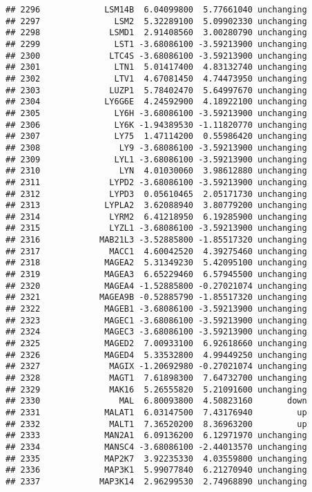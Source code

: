 \documentclass[]{article}
\begin{document}
\begin{verbatim}
## 2296             LSM14B  6.04099800  5.77661040 unchanging
## 2297               LSM2  5.32289100  5.09902330 unchanging
## 2298              LSMD1  2.91408560  3.00280790 unchanging
## 2299               LST1 -3.68086100 -3.59213900 unchanging
## 2300              LTC4S -3.68086100 -3.59213900 unchanging
## 2301               LTN1  5.01417400  4.83132740 unchanging
## 2302               LTV1  4.67081450  4.74473950 unchanging
## 2303              LUZP1  5.78402470  5.64997670 unchanging
## 2304             LY6G6E  4.24592900  4.18922100 unchanging
## 2305               LY6H -3.68086100 -3.59213900 unchanging
## 2306               LY6K -1.94389530 -1.11820770 unchanging
## 2307               LY75  1.47114200  0.55986420 unchanging
## 2308                LY9 -3.68086100 -3.59213900 unchanging
## 2309               LYL1 -3.68086100 -3.59213900 unchanging
## 2310                LYN  4.01030060  3.98612880 unchanging
## 2311              LYPD2 -3.68086100 -3.59213900 unchanging
## 2312              LYPD3  0.05610465  2.05171730 unchanging
## 2313             LYPLA2  3.62088940  3.80779200 unchanging
## 2314              LYRM2  6.41218950  6.19285900 unchanging
## 2315              LYZL1 -3.68086100 -3.59213900 unchanging
## 2316            MAB21L3 -3.52885800 -1.85517320 unchanging
## 2317              MACC1  4.60042520  4.39275460 unchanging
## 2318             MAGEA2  5.31349230  5.42095100 unchanging
## 2319             MAGEA3  6.65229460  6.57945500 unchanging
## 2320             MAGEA4 -1.52885800 -0.27021074 unchanging
## 2321            MAGEA9B -0.52885790 -1.85517320 unchanging
## 2322             MAGEB1 -3.68086100 -3.59213900 unchanging
## 2323             MAGEC1 -3.68086100 -3.59213900 unchanging
## 2324             MAGEC3 -3.68086100 -3.59213900 unchanging
## 2325             MAGED2  7.00933100  6.92618660 unchanging
## 2326             MAGED4  5.33532800  4.99449250 unchanging
## 2327              MAGIX -1.20692980 -0.27021074 unchanging
## 2328              MAGT1  7.61898300  7.64732700 unchanging
## 2329              MAK16  5.26555820  5.21091600 unchanging
## 2330                MAL  6.80093800  4.50823160       down
## 2331             MALAT1  6.03147500  7.43176940         up
## 2332              MALT1  7.36520200  8.36963200         up
## 2333             MAN2A1  6.09136200  6.12971970 unchanging
## 2334             MANSC4 -3.68086100 -2.44013570 unchanging
## 2335             MAP2K7  3.92235330  4.03559800 unchanging
## 2336             MAP3K1  5.99077840  6.21270940 unchanging
## 2337            MAP3K14  2.96299530  2.74968890 unchanging

\end{verbatim}
\end{document}

